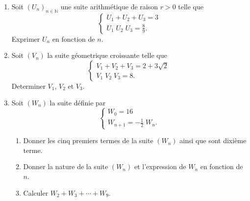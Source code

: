 \begin{exo}
      \begin{enumerate}
            \item Soit $(U_n)_{n\in\mathbb{N}}$ une suite arithm\'etique de raison $r > 0$ telle que 
                  \[
                        \left\lbrace
                              \begin{array}{l}
                                    U_1 + U_2 + U_3 = 3 \\
                                    U_1 \; U_2 \; U_3 = \frac{8}{9} .
                              \end{array}
                        \right.
                  \]
                  Exprimer $U_n$ en fonction de $n$.
            \item Soit $(V_n)$ la suite g\'eometrique croissante telle que 
                  \[
                        \left\lbrace
                              \begin{array}{l}
                                    V_1 + V_2 + V_3 = 2 + 3 \sqrt{2} \\
                                    V_1 \; V_2 \; V_3 = 8 .
                              \end{array}
                        \right.
                  \]
                  Determiner $V_1$, $V_2$ et $V_3$.
            \item Soit $(W_n)$ la suite d\'efinie par 
                  \[
                        \left\lbrace
                              \begin{array}{l}
                                    W_0 = 16  \\
                                    W_{n+1} = -\frac{1}{2} \; W_n .
                              \end{array}
                        \right.
                  \]      
                  \begin{enumerate}
                        \item Donner les cinq premiers termes de la suite $(W_n)$ ainsi que sont dixi\`eme terme.
                        \item Donner la nature de la suite $(W_n)$ et l'expression de $W_n$ en fonction de $n$.
                        \item Calculer $W_2 + W_3 + \cdots + W_9$.
                  \end{enumerate}
      \end{enumerate}
\end{exo}
%
